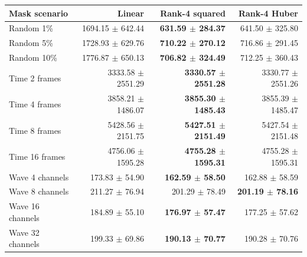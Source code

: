 \begingroup
{}
\begin{tabular}{lrrr}
\toprule
Mask scenario & Linear & Rank-4 squared & Rank-4 Huber \\
\midrule
Random 1\% & 1694.15 $\pm$ 642.44 & \textbf{631.59 $\pm$ 284.37} & 641.50 $\pm$ 325.80 \\
Random 5\% & 1728.93 $\pm$ 629.76 & \textbf{710.22 $\pm$ 270.12} & 716.86 $\pm$ 291.45 \\
Random 10\% & 1776.87 $\pm$ 650.13 & \textbf{706.82 $\pm$ 324.49} & 712.25 $\pm$ 360.43 \\
Time 2 frames & 3333.58 $\pm$ 2551.29 & \textbf{3330.57 $\pm$ 2551.28} & 3330.77 $\pm$ 2551.26 \\
Time 4 frames & 3858.21 $\pm$ 1486.07 & \textbf{3855.30 $\pm$ 1485.43} & 3855.39 $\pm$ 1485.47 \\
Time 8 frames & 5428.56 $\pm$ 2151.75 & \textbf{5427.51 $\pm$ 2151.49} & 5427.54 $\pm$ 2151.48 \\
Time 16 frames & 4756.06 $\pm$ 1595.28 & \textbf{4755.28 $\pm$ 1595.31} & 4755.28 $\pm$ 1595.31 \\
Wave 4 channels & 173.83 $\pm$ 54.90 & \textbf{162.59 $\pm$ 58.50} & 162.88 $\pm$ 58.59 \\
Wave 8 channels & 211.27 $\pm$ 76.94 & 201.29 $\pm$ 78.49 & \textbf{201.19 $\pm$ 78.16} \\
Wave 16 channels & 184.89 $\pm$ 55.10 & \textbf{176.97 $\pm$ 57.47} & 177.25 $\pm$ 57.62 \\
Wave 32 channels & 199.33 $\pm$ 69.86 & \textbf{190.13 $\pm$ 70.77} & 190.28 $\pm$ 70.76 \\
\bottomrule
\end{tabular}
\endgroup
